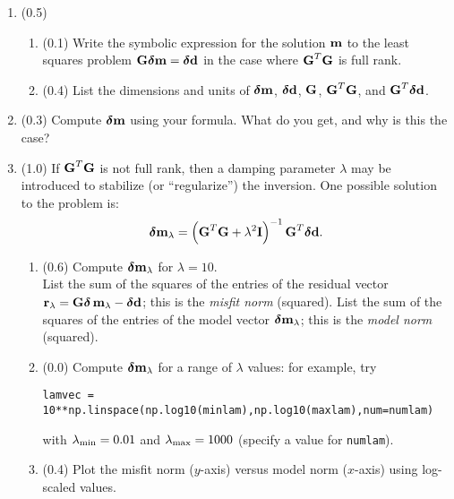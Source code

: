 \documentclass[11pt,titlepage,fleqn]{article}
\begin{document}
\begin{enumerate}
\item (0.5)
\begin{enumerate}
\item (0.1) Write the symbolic expression for the solution $\mbox{${\bf m}$}$ to the least squares problem $\mbox{${\bf G}$}\mbox{\boldmath $\bf \delta$}\mbox{${\bf m}$}=\mbox{\boldmath $\bf \delta$}\mbox{${\bf d}$}$ in the case where $\mbox{${\bf G}$}^T\mbox{${\bf G}$}$ is full rank.

\item (0.4) List the dimensions and units of $\mbox{\boldmath $\bf \delta$}\mbox{${\bf m}$}$, $\mbox{\boldmath $\bf \delta$}\mbox{${\bf d}$}$, $\mbox{${\bf G}$}$, $\mbox{${\bf G}$}^T\mbox{${\bf G}$}$, and $\mbox{${\bf G}$}^T\mbox{\boldmath $\bf \delta$}\mbox{${\bf d}$}$.
\end{enumerate}


\item (0.3) Compute $\mbox{\boldmath $\bf \delta$}\mbox{${\bf m}$}$ using your formula.  What do you get, and why is this the case?


\item (1.0) If $\mbox{${\bf G}$}^T\mbox{${\bf G}$}$ is not full rank, then a damping parameter $\lambda$ may be introduced to stabilize (or ``regularize'') the inversion.  One possible solution to the problem is:
%
\begin{equation}
\mbox{\boldmath $\bf \delta$}\mbox{${\bf m}$}_{\lambda} = \left(\mbox{${\bf G}$}^T\mbox{${\bf G}$}+\lambda^2\mbox{${\bf I}$}\right)^{-1}\mbox{${\bf G}$}^T\mbox{\boldmath $\bf \delta$}\mbox{${\bf d}$}.
\end{equation}
%
\begin{enumerate}

\item (0.6) Compute $\mbox{\boldmath $\bf \delta$}\mbox{${\bf m}$}_{\lambda}$ for $\lambda = 10$. \\
List the sum of the squares of the entries of the residual vector $\mbox{${\bf r}$}_\lambda = \mbox{${\bf G}$}\mbox{\boldmath $\bf \delta$}\,\mbox{${\bf m}$}_\lambda-\mbox{\boldmath $\bf \delta$}\mbox{${\bf d}$}$; this is the {\em misfit norm} (squared).
List the sum of the squares of the entries of the model vector $\mbox{\boldmath $\bf \delta$}\mbox{${\bf m}$}_{\lambda}$; this is the {\em model norm} (squared).


\item (0.0) Compute $\mbox{\boldmath $\bf \delta$}\mbox{${\bf m}$}_{\lambda}$ for a range of $\lambda$ values: for example, try

\verb+lamvec = 10**np.linspace(np.log10(minlam),np.log10(maxlam),num=numlam)+

with $\lambda_{\rm min} = 0.01$ and $\lambda_{\rm max} = 1000$ (specify a value for \verb+numlam+).


\item (0.4) Plot the misfit norm ($y$-axis) versus model norm ($x$-axis) using log-scaled values.


\end{enumerate}
\end{enumerate}
\end{document}
